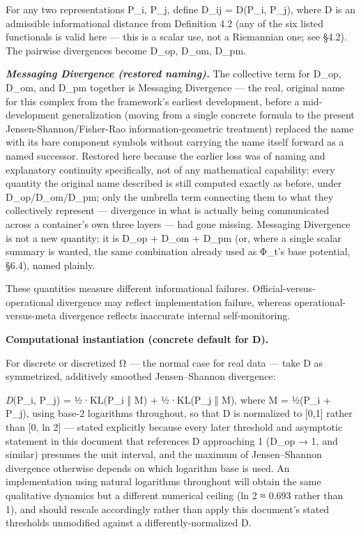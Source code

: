 \documentclass[
]{article}
\begin{document}
For any two representations P\_i, P\_j, define D\_ij = D(P\_i, P\_j),
where D is an admissible informational distance from Definition 4.2 (any
of the six listed functionals is valid here --- this is a scalar use,
not a Riemannian one; see §4.2). The pairwise divergences become D\_op,
D\_om, D\_pm.

\emph{\textbf{Messaging Divergence (restored naming).}} The collective
term for D\_op, D\_om, and D\_pm together is Messaging Divergence ---
the real, original name for this complex from the framework's earliest
development, before a mid-development generalization (moving from a
single concrete formula to the present Jensen-Shannon/Fisher-Rao
information-geometric treatment) replaced the name with its bare
component symbols without carrying the name itself forward as a named
successor. Restored here because the earlier loss was of naming and
explanatory continuity specifically, not of any mathematical capability:
every quantity the original name described is still computed exactly as
before, under D\_op/D\_om/D\_pm; only the umbrella term connecting them
to what they collectively represent --- divergence in what is actually
being communicated across a container's own three layers --- had gone
missing. Messaging Divergence is not a new quantity; it is D\_op + D\_om
+ D\_pm (or, where a single scalar summary is wanted, the same
combination already used as Φ\_t's base potential, §6.4), named plainly.

These quantities measure different informational failures.
Official-versus-operational divergence may reflect implementation
failure, whereas operational-versus-meta divergence reflects inaccurate
internal self-monitoring.

\textbf{Computational instantiation (concrete default for D).}

For discrete or discretized Ω --- the normal case for real data --- take
D as symmetrized, additively smoothed Jensen--Shannon divergence:

\emph{D}(P\_i, P\_j) = ½·KL(P\_i ‖ M) + ½·KL(P\_j ‖ M), where M = ½(P\_i
+ P\_j), using base-2 logarithms throughout, so that D is normalized to
{[}0,1{]} rather than {[}0, ln 2{]} --- stated explicitly because every
later threshold and asymptotic statement in this document that
references D approaching 1 (D\_op → 1, and similar) presumes the unit
interval, and the maximum of Jensen--Shannon divergence otherwise
depends on which logarithm base is used. An implementation using natural
logarithms throughout will obtain the same qualitative dynamics but a
different numerical ceiling (ln 2 ≈ 0.693 rather than 1), and should
rescale accordingly rather than apply this document's stated thresholds
unmodified against a differently-normalized D.
\end{document}
